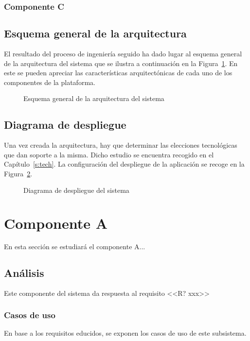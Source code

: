 \subsubsection*{Componente C}



\subsection{Esquema general de la arquitectura}
El resultado del proceso de ingeniería seguido ha dado lugar al esquema general de la arquitectura del sistema que se ilustra a continuación en la Figura~\ref{f:dev:arch}. En este se pueden apreciar las características arquitectónicas de cada uno de los componentes de la plataforma.

\begin{figure}[h!]
\centering
\caption{Esquema general de la arquitectura del sistema}
\label{f:dev:arch}
\end{figure}


\subsection{Diagrama de despliegue}
Una vez creada la arquitectura, hay que determinar las elecciones tecnológicas que dan soporte a la misma. Dicho estudio se encuentra recogido en el Capítulo~\ref{s:tech}. La configuración del despliegue de la aplicación se recoge en la Figura~\ref{f:dev:arch-deploy}.

\begin{figure}[h!]
\centering
\caption{Diagrama de despliegue del sistema}
\label{f:dev:arch-deploy}
\end{figure}


\section{Componente A}
En esta sección se estudiará el componente A...

\subsection{Análisis}
Este componente del sistema da respuesta al requisito <<R? xxx>> 

\subsubsection{Casos de uso}
En base a los requisitos educidos, se exponen los casos de uso de este subsistema.

